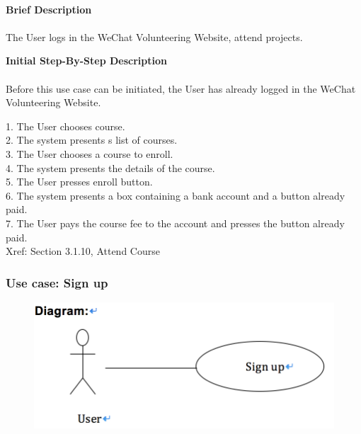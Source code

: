\documentclass[12pt]{report}
\begin{document}
\paragraph{}
\begin{flushleft}
\textbf{Brief Description }
\paragraph{}
The User logs in the WeChat Volunteering Website, attend projects.\\

\begin{flushleft}
\textbf{Initial Step-By-Step Description }
\paragraph{}
Before this use case can be initiated, the User has already logged in the WeChat Volunteering Website.
\begin{flushleft}
1.	The User chooses course. \\
2.	The system presents s list of courses. \\
3.	The User chooses a course to enroll. \\
4.	The system presents the details of the course. \\
5.	The User presses enroll button. \\
6.	The system presents a box containing a bank account and a button already paid. \\
7.	The User pays the course fee to the account and presses the button already paid. \\
Xref: Section 3.1.10, Attend Course

\end{flushleft}
\end{flushleft}
\end{flushleft}


\newpage
\subsubsection{Use case:   Sign up }

\begin{figure}[!htb]
  \includegraphics{11.PNG}
\end{figure}
\end{document}
